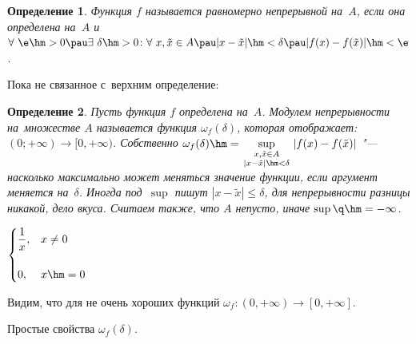 \documentclass[a4paper,10pt,twoside]{article}
\newtheorem{Def}{Определение}[section]
\begin{document}
 \begin{Def}\label{ravnep}
Функция $f$ называется равномерно непрерывной на~$A$, если она определена на~$A$ и $\forall\ \e\hm>0\pau
\exists\  \delta\hm>0\colon \forall\  x,\tilde x\in A\pau |x-\tilde x|\hm<\delta\pau |f(x)-f(\tilde x)|\hm<\e$.
 \end{Def}

 Пока не связанное с~верхним определение:

 \begin{Def}
 Пусть функция $f$ определена на~$A$. Модулем непрерывности на~множестве $A$ называется функция 
 $\omega_f(\delta)$, которая отображает: $(0;+\infty)\to[0,+\infty)$. Собственно $\omega_f(\delta)\hm=
 \sup\limits_{\begin{smallmatrix}x,\tilde x\in A\\|x-\tilde x|\hm<\delta\end{smallmatrix}}|f(x)-f(\tilde x)|$ 
 "--- насколько максимально может меняться значение функции, если аргумент меняется на~$\delta$.
 Иногда под~$\sup$ пишут $|x-\tilde x|\leq\delta$, для непрерывности разницы никакой, дело вкуса. 
 Считаем также, что $A$ непусто, иначе $\sup \q\hm=-\infty$.
 \end{Def}

 $\begin{cases}
\dfrac1x,&x\neq0\\ \\
0,&x\hm=0
 \end{cases}$ 

Видим, что для не очень хороших функций $\omega_f\colon (0,+\infty)\to[0,+\infty]$.

 Простые свойства $\omega_f(\delta)$.
\end{document}
